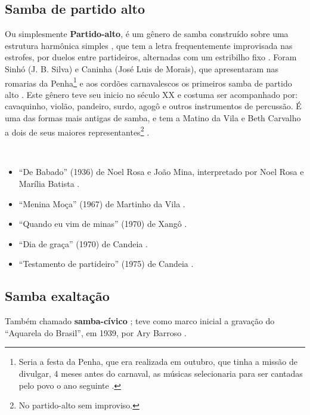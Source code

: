 \subsection{Samba de partido alto}
Ou simplesmente \textbf{Partido-alto}, 
é um gênero de samba construído sobre uma estrutura harmônica simples \cite[pp. 291]{dourado2004dicionario}, 
que tem a letra frequentemente improvisada  nas estrofes, por duelos entre partideiros, alternadas com um estribilho fixo \cite[128]{perna2002samba} \cite[pp. 291]{dourado2004dicionario}.
Foram Sinhó (J. B. Silva) e Caninha (José Luis de Morais),
que apresentaram nas romarias da Penha\footnote{Seria 
a festa da Penha, que era realizada em outubro, que tinha a missão
de divulgar, 4 meses antes do carnaval, 
as músicas selecionaria para ser cantadas
 pelo povo o ano seguinte \cite[Cad. B pp. 4]{jornalsambaderoda5}.} e aos cordões carnavalescos os primeiros samba de partido alto \cite[pp. 4]{musicasambavariasdef1}. 
Este gênero teve seu inicio no século XX e costuma ser acompanhado por: 
cavaquinho, violão, pandeiro, surdo, agogô e outros instrumentos de percussão.
É uma das formas mais antigas de samba, 
e tem a Matino da Vila e Beth Carvalho a dois de seus maiores representantes\footnote{No partido-alto sem improviso.} \cite[pp. 291]{dourado2004dicionario} \cite[pp. 212]{diniz2006almanaque}. 

\begin{example} ~

\begin{itemize}
\item ``De Babado'' (1936) de Noel Rosa e João Mina, interpretado por  Noel Rosa e Marília Batista \cite[pp. 46]{diniz2006almanaque}.
\item ``Menina Moça'' (1967) de Martinho da Vila \cite[pp. 185]{diniz2006almanaque}.
\item ``Quando eu vim de minas'' (1970) de Xangô \cite[pp. 212]{diniz2006almanaque}.
\item ``Dia de graça'' (1970) de Candeia \cite[pp. 137]{marcondes1977enciclopedia} \cite[pp. 121]{diniz2006almanaque}.
\item ``Testamento de partideiro'' (1975) de Candeia \cite[pp. 105]{raca1999} \cite[pp. 122]{diniz2006almanaque}.
\end{itemize}
\end{example}


\subsection{Samba exaltação}
Também chamado \textbf{samba-cívico} \cite[pp. 105]{naves1998violao};
teve como marco inicial a gravação do ``Aquarela do Brasil'', em 1939, 
por Ary Barroso \cite[pp. 73]{diniz2006almanaque} \cite[pp. 128]{perna2002samba} \cite[pp. 77]{fenerick2005nem}.

